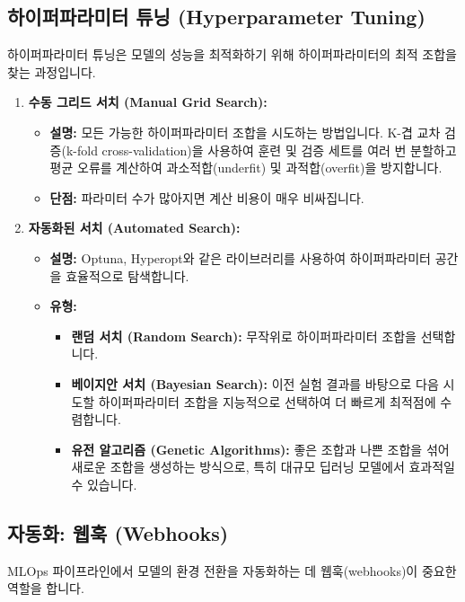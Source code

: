 \documentclass[11pt,a4paper]{article}
\theoremstyle{definition}
\begin{document}
\subsection{하이퍼파라미터 튜닝 (Hyperparameter Tuning)}

하이퍼파라미터 튜닝은 모델의 성능을 최적화하기 위해 하이퍼파라미터의 최적 조합을 찾는 과정입니다.

\begin{enumerate}
    \item \textbf{수동 그리드 서치 (Manual Grid Search):}
    \begin{itemize}
        \item \textbf{설명:} 모든 가능한 하이퍼파라미터 조합을 시도하는 방법입니다. K-겹 교차 검증(k-fold cross-validation)을 사용하여 훈련 및 검증 세트를 여러 번 분할하고 평균 오류를 계산하여 과소적합(underfit) 및 과적합(overfit)을 방지합니다.
        \item \textbf{단점:} 파라미터 수가 많아지면 계산 비용이 매우 비싸집니다.
    \end{itemize}

    \item \textbf{자동화된 서치 (Automated Search):}
    \begin{itemize}
        \item \textbf{설명:} Optuna, Hyperopt와 같은 라이브러리를 사용하여 하이퍼파라미터 공간을 효율적으로 탐색합니다.
        \item \textbf{유형:}
        \begin{itemize}
            \item \textbf{랜덤 서치 (Random Search):} 무작위로 하이퍼파라미터 조합을 선택합니다.
            \item \textbf{베이지안 서치 (Bayesian Search):} 이전 실험 결과를 바탕으로 다음 시도할 하이퍼파라미터 조합을 지능적으로 선택하여 더 빠르게 최적점에 수렴합니다.
            \item \textbf{유전 알고리즘 (Genetic Algorithms):} 좋은 조합과 나쁜 조합을 섞어 새로운 조합을 생성하는 방식으로, 특히 대규모 딥러닝 모델에서 효과적일 수 있습니다.
        \end{itemize}
    \end{itemize}
\end{enumerate}

\subsection{자동화: 웹훅 (Webhooks)}

MLOps 파이프라인에서 모델의 환경 전환을 자동화하는 데 웹훅(webhooks)이 중요한 역할을 합니다.
\end{document}
